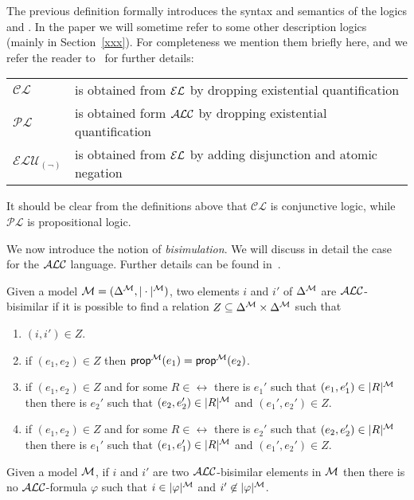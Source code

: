 The previous definition formally introduces the syntax and semantics of the
logics \alc and \el.  In the paper we will sometime refer to some other description logics (mainly in Section~\ref{xxx}).  For completeness we mention them briefly here,
and we refer the reader to~\cite{baad:desc03} for further details:

\begin{center}
\begin{tabular}{lp{6cm}}
$\mathcal{CL}$ & is obtained from $\mathcal{EL}$ by dropping existential quantification\\
$\mathcal{PL}$ & is obtained form $\mathcal{ALC}$ by dropping existential quantification\\
$\mathcal{ELU}_{(\neg)}$ & is obtained from $\mathcal{EL}$ by adding disjunction and atomic negation
\end{tabular}
\end{center}

\noindent
It should be clear from the definitions above that $\mathcal{CL}$ is conjunctive logic, while $\mathcal{PL}$ is propositional logic.

We now introduce the notion of \emph{bisimulation}.  We will discuss in detail
the case for the $\mathcal{ALC}$ language.  Further details can be found
in~\cite{blac:moda01,kurt:expr99}.

\begin{definition}
Given a model $\mathcal{M} = (\Delta^{\mathcal{M}},|\cdot|^{\mathcal{M}})$, two elements $i$ and $i'$ of $\Delta^{\mathcal{M}}$ are $\mathcal{ALC}$-bisimilar if it is possible to find a relation $Z \subseteq \Delta^{\mathcal{M}} \times \Delta^{\mathcal{M}}$ such that
\begin{enumerate}
\item $(i,i') \in Z$.
\item if $(e_1, e_2) \in Z$ then $\textsf{prop}^{\mathcal{M}}(e_1) = \textsf{prop}^{\mathcal{M}}(e_2)$.
\item if $(e_1,e_2) \in Z$ and for some $R \in \rel$ there is $e_1'$ such that
$(e_1,e_1') \in |R|^{\mathcal{M}}$ then there is $e_2'$ such that $(e_2,e_2') \in |R|^{\mathcal{M}}$ and
$(e_1',e_2') \in Z$.
\item if $(e_1,e_2) \in Z$ and for some $R \in \rel$ there is $e_2'$ such that
$(e_2,e_2') \in |R|^{\mathcal{M}}$ then there is $e_1'$ such that $(e_1,e_1') \in |R|^{\mathcal{M}}$ and
$(e_1',e_2') \in Z$.
\end{enumerate}
\end{definition}

\begin{theorem}[]\label{bisim}
Given a model $\mathcal{M}$, if  $i$ and $i'$ are two $\mathcal{ALC}$-bisimilar elements in $\mathcal{M}$
then there is no $\mathcal{ALC}$-formula $\varphi$ such that $i \in |\varphi|^{\mathcal{M}}$ and
$i' \not \in |\varphi|^{\mathcal{M}}$.
\end{theorem}

